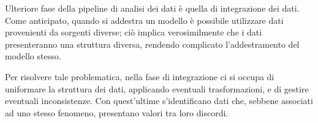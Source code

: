 \documentclass{subfiles}
\begin{document}
Ulteriore fase della pipeline di analisi dei dati è quella di integrazione dei dati.
Come anticipato, quando si addestra un modello è possibile utilizzare dati provenienti da sorgenti diverse;
ciò implica verosimilmente che i dati presenteranno una struttura diversa, rendendo complicato l'addestramento del modello stesso.

Per risolvere tale problematica, nella fase di integrazione ci si occupa di uniformare la struttura dei dati, applicando eventuali trasformazioni,
e di gestire eventuali inconsistenze. Con quest'ultime s'identificano dati che, sebbene associati ad uno stesso fenomeno,
presentano valori tra loro discordi.
\end{document}
